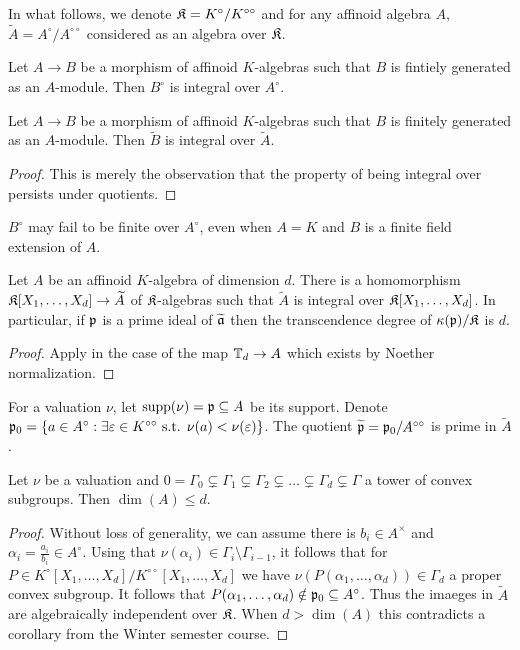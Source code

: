 In what follows, we denote $\mathfrak{K}=K^{\circ}/K^{\circ\circ}$ and for any affinoid algebra $A$, $\widetilde{A}=A^{\circ}/A^{\circ\circ}$ considered as an algebra over $\mathfrak{K}$. 
\begin{proposition}
    Let $A\to B$ be a morphism of affinoid $K$-algebras such that $B$ is fintiely generated as an $A$-module. Then $B^{\circ}$ is integral over $A^{\circ}$. 
\end{proposition}
\begin{proposition}\label{prop: integral over for fg modules}
    Let $A\to B$ be a morphism of affinoid $K$-algebras such that $B$ is finitely generated as an $A$-module. Then $\widetilde{B}$ is integral over $\widetilde{A}$. 
\end{proposition}
\begin{proof}
    This is merely the observation that the property of being integral over persists under quotients. 
\end{proof}
\begin{remark}
    $B^{\circ}$ may fail to be finite over $A^{\circ}$, even when $A=K$ and $B$ is a finite field extension of $A$. 
\end{remark}
\begin{corollary}
    Let $A$ be an affinoid $K$-algebra of dimension $d$. There is a homomorphism $\mathfrak{K}[X_{1},\dots,X_{d}]\to \widetilde{A}$ of $\mathfrak{K}$-algebras such that $\widetilde{A}$ is integral over $\mathfrak{K}[X_{1},\dots,X_{d}]$. In particular, if $\mathfrak{p}$ is a prime ideal of $\widetilde{\mathfrak{a}}$ then the transcendence degree of $\kappa(\mathfrak{p})/\mathfrak{K}$ is $d$. 
\end{corollary}
\begin{proof}
    Apply  in the case of the map $\mathbb{T}_{d}\to A$ which exists by Noether normalization. 
\end{proof}
For a valuation $\nu$, let $\mathrm{supp}(\nu)=\mathfrak{p}\subseteq A$ be its support. Denote $\mathfrak{p}_{0}=\{a\in A^{\circ}:\exists\varepsilon\in K^{\circ\circ}\text{ s.t. }\nu(a)<\nu(\varepsilon)\}$. The quotient $\widetilde{\mathfrak{p}}=\mathfrak{p}_{0}/A^{\circ\circ}$ is prime in $\widetilde{A}$. 
\begin{proposition}\label{prop: Krull dimension statement}
    Let $\nu$ be a valuation and $0=\Gamma_{0}\subsetneq\Gamma_{1}\subsetneq\Gamma_{2}\subsetneq\dots\subsetneq\Gamma_{d}\subsetneq\Gamma$ a tower of convex subgroups. Then $\dim(A)\leq d$.  
\end{proposition}
\begin{proof}
    Without loss of generality, we can assume there is $b_{i}\in A^{\times}$ and $\alpha_{i}=\frac{a_{i}}{b_{i}}\in A^{\circ}$. Using that $\nu(\alpha_{i})\in\Gamma_{i}\setminus\Gamma_{i-1}$, it follows that for $P\in K^{\circ}[X_{1},\dots,X_{d}]/K^{\circ\circ}[X_{1},\dots,X_{d}]$ we have $\nu(P(\alpha_{1},\dots,\alpha_{d}))\in\Gamma_{d}$ a proper convex subgroup. It follows that $P(\alpha_{1},\dots,\alpha_{d})\notin\mathfrak{p}_{0}\subseteq A^{\circ}$. Thus the imaeges in $\widetilde{A}$ are algebraically independent over $\mathfrak{K}$. When $d>\dim(A)$ this contradicts a corollary from the Winter semester course. 
\end{proof}
